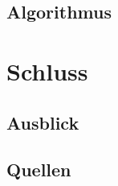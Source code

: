 \documentclass[18pt]{beamer}
\begin{document}
\subsection{Algorithmus}


\section{Schluss}
\subsection{Ausblick}

\subsection{Quellen}
\begin{frame}{~}
		
		
\end{frame}
\end{document}
